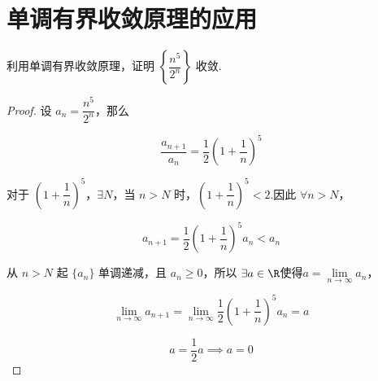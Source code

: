 \section{单调有界收敛原理的应用}
\begin{example}
	利用单调有界收敛原理，证明 $\left\{\dfrac{n^5}{2^n}\right\}$ 收敛.
	
	
\end{example}
\begin{proof}
	设 $a_n = \dfrac{n^5}{2^n}$，那么
	
	\[
	\frac{a_{n+1}}{a_n} = \frac{1}{2} \left(1 + \frac{1}{n}\right)^5
	\]
	
	对于 $(1 + \dfrac{1}{n})^5$，$\exists N$，当 $n > N$ 时，$(1 + \dfrac{1}{n})^5 < 2$.因此 $\forall n > N$，
	
	\[
	a_{n+1} = \frac{1}{2} \left(1 + \frac{1}{n}\right)^5 a_n < a_n
	\]
	
	从 $n > N$ 起 $\{a_n\}$ 单调递减，且 $a_n \geqslant 0$，所以 $\exists a\in\R$使得$a = \lim\limits_{n\to\infty} a_n$，
	
	\[
	\lim_{n \to \infty} a_{n+1} = \lim_{n \to \infty} \frac{1}{2} \left(1 + \frac{1}{n}\right)^5 a_n = a
	\]
	
	\[
	a = \frac{1}{2} a \implies a = 0
	\]
\end{proof}

